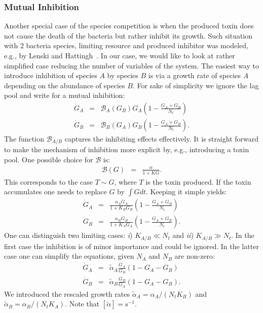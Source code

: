 \documentclass[10pt,A4paper]{article}
\begin{document}
\subsubsection{Mutual Inhibition}
Another special case of the species competition is when the produced toxin does not cause the death of the bacteria but rather inhibit its growth.
Such situation with 2 bacteria species, limiting resource and produced inhibitor was modeled, e.g., by Lenski and Hattingh~\cite{lenski_coexistence_1986}.
In our case, we would like to look at rather simplified case reducing the number of variables of the system.
The easiest way to introduce inhibition of species $A$ by species $B$ is via a growth rate of species $A$ depending on the abundance of species $B$.
For sake of simplicity we ignore the lag pool and write for a mutual inhibition:
\begin{eqnarray}
    \dot{G}_A &=& \mathcal{B}_A(G_B)G_A\left(1 - \frac{G_A+G_B}{N_t}\right)\\
    \dot{G}_B &=& \mathcal{B}_B(G_A) G_B\left(1-\frac{G_A+G_B}{N_t}\right).
\end{eqnarray}
The function $\mathcal{B}_{A/B}$ captures the inhibiting effects effectively.
It is straight forward to make the mechanism of inhibition more explicit by, e.g., introducing a toxin pool.
One possible choice for $\mathcal{B}$ is:
\begin{eqnarray}
    \mathcal{B}(G)&=&\frac{\alpha}{1+KG}. 
\end{eqnarray}
This corresponds to the case $T\sim G$, where $T$ is the toxin produced.
If the toxin accumulates one needs to replace $G$ by $\int G dt$. Keeping it simple yields:
\begin{eqnarray}
    \dot{G}_A &=& \frac{\alpha_A G_A}{1+K_BG_B}\left(1 - \frac{G_A+G_B}{N_t}\right)\\
    \dot{G}_B &=& \frac{\alpha_B G_B}{1+K_AG_A}\left(1-\frac{G_A+G_B}{N_t}\right). 
\end{eqnarray}
One can distinguish two limiting cases: {\it i}) $K_{A/B}\ll N_t$ and {\it ii}) $K_{A/B}\gg N_t$.
In the first case the inhibition is of minor importance and could be ignored.
In the latter case one can simplify the equations, given $N_A$ and $N_B$ are non-zero:
\begin{eqnarray}
\label{Mut_Inhib}
    \dot{G}_A &=&\tilde{\alpha}_A\frac{G_A}{G_B}\left(1 - G_A-G_B\right)\\
    \dot{G}_B &=& \tilde{\alpha}_B\frac{G_B}{G_A}\left(1-G_A-G_B\right).
\end{eqnarray}
We introduced the rescaled growth rates $\tilde{\alpha}_A=\alpha_A/(N_tK_B)$ and $\tilde{\alpha}_B=\alpha_B/(N_tK_A)$. Note that $[\tilde{\alpha}]=\mathrm{s}^{-1}$.
\end{document}
